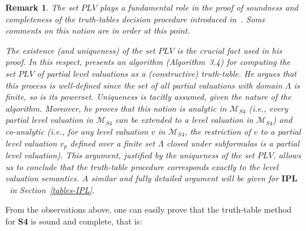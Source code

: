 \documentclass[12pt]{article}
\newtheorem{proposition}[theorem]{Proposition}
\newtheorem{remark}[theorem]{Remark}
\newcommand{\ipl}{\ensuremath{\mathbf{IPL}}}
\begin{document}
    

\begin{remark} \label{rem:PLVs} The set $PLV$ plays a fundamental role in the proof of soundness and completeness of the truth-tables decision procedure introduced in~\cite{gratz_truth_2022}. Some comments on this notion are in order at this point. 

The existence (and uniqueness) of the set $PLV$ is the crucial fact used in his proof. In this respect, \cite[p. 15]{gratz_truth_2022} presents an algorithm (Algorithm~3.4)  for computing the set  $PLV$ of partial level valuations as a (constructive) truth-table. He argues that this process is well-defined since the set of all partial valuations with domain $\Lambda$ is finite, so is its powerset. Uniqueness is tacitly assumed, given the nature of the algorithm. Moreover, he proves that this notion is analytic in $\mathcal{M}_{S4}$ (i.e., every partial level valuation in $\mathcal{M}_{S4}$ can be extended to a level valuation in $\mathcal{M}_{S4}$) and co-analytic (i.e., for any level valuation $v$ in $\mathcal{M}_{S4}$, the restriction of $v$ to a partial level valuation $v_p$ defined over a finite set $\Lambda$ closed under subformulas is a partial level valuation). This argument, justified by the uniqueness of the set $PLV$, allows us to conclude that the truth-table procedure corresponds exactly to the level valuation semantics. A similar and fully detailed argument will be given for  \ipl\ in Section~\ref{tables-IPL}.
\end{remark}


    

From the observations above, one can easily prove that the truth-table method for \textbf{S4} is sound and complete, that is:
\end{document}
